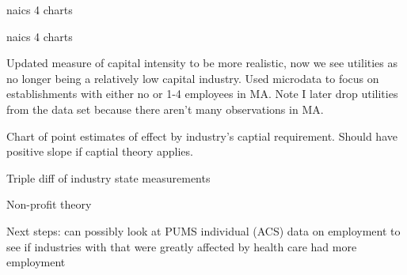\documentclass[12pt]{article}
\begin{document}
naics 4 charts

\pagebreak

naics 4 charts

\pagebreak

\pagebreak

Updated measure of capital intensity to be more realistic, now we see utilities as no longer being a relatively low capital industry. Used microdata to focus on establishments with either no or 1-4 employees in MA. Note I later drop utilities from the data set because there aren't many observations in MA. 



\pagebreak

Chart of point estimates of effect by industry's captial requirement. Should have positive slope if captial theory applies. 

\pagebreak

Triple diff of industry state measurements

\pagebreak


Non-profit theory

\pagebreak

Next steps: can possibly look at PUMS individual (ACS) data on employment to see if industries with that were greatly affected by health care had more employment
\end{document}
